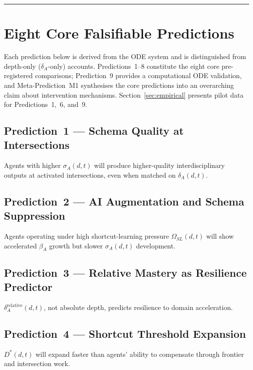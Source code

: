 \noindent\rule{\linewidth}{0.4pt}


\section{Eight Core Falsifiable Predictions}\label{sec:predictions}

Each prediction below is derived from the ODE system and is distinguished from depth-only ($\delta_A$-only) accounts. Predictions~1--8 constitute the eight core pre-registered comparisons; Prediction~9 provides a computational ODE validation, and Meta-Prediction~M1 synthesises the core predictions into an overarching claim about intervention mechanisms. Section~\ref{sec:empirical} presents pilot data for Predictions~1,~6, and~9.

\subsection{Prediction~1 --- Schema Quality at Intersections}
Agents with higher $\sigma_A(d,t)$ will produce higher-quality
interdisciplinary outputs at activated intersections, even when matched
on $\delta_A(d,t)$.

\subsection{Prediction~2 --- AI Augmentation and Schema Suppression}
Agents operating under high shortcut-learning pressure $\Omega_{SL}(d,t)$ will show accelerated $\beta_A$
growth but slower $\sigma_A(d,t)$ development.

\subsection{Prediction~3 --- Relative Mastery as Resilience Predictor}
$\delta_A^{\text{relative}}(d,t)$, not absolute depth, predicts
resilience to domain acceleration.

\subsection{Prediction~4 --- Shortcut Threshold Expansion}
$D^*(d,t)$ will expand faster than agents' ability to compensate through
frontier and intersection work.

